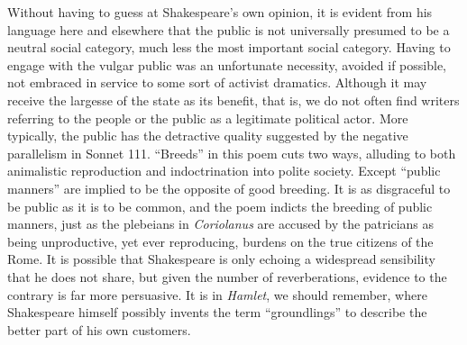 Without having to guess at Shakespeare's own opinion, it is evident from his language here and elsewhere that the public is not universally presumed to be a neutral social category, much less the most important social category.
Having to engage with the vulgar public was an unfortunate necessity, avoided if possible, not embraced in service to some sort of activist dramatics.
Although it may receive the largesse of the state as its benefit, that is, we do not often find writers referring to the people or the public as a legitimate political actor.
More typically, the public has the detractive quality suggested by the negative parallelism in Sonnet 111.
``Breeds'' in this poem cuts two ways, alluding to both animalistic reproduction and indoctrination into polite society.
Except ``public manners'' are implied to be the opposite of good breeding.
It is as disgraceful to be public as it is to be common, and the poem indicts the breeding of public manners, just as the plebeians in \emph{Coriolanus} are accused by the patricians as being unproductive, yet ever reproducing, burdens on the true citizens of the Rome. It is possible that Shakespeare is only echoing a widespread sensibility that he does not share, but given the number of reverberations, evidence to the contrary is far more persuasive.
It is in \emph{Hamlet}, we should remember, where Shakespeare himself possibly invents the term ``groundlings'' to describe the better part of his own customers.

